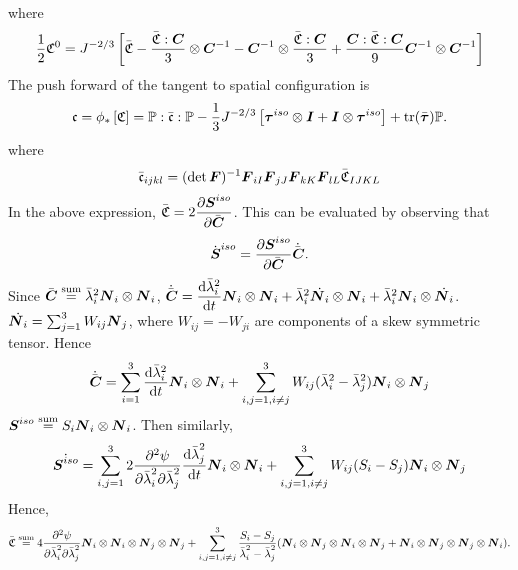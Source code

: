\documentclass[11pt,twoside,TimesRoman]{article}
\newcommand{\parder}[2]{{\dfrac{\partial #1}{\partial #2}}}
\newcommand{\totder}[2]{{\dfrac{\mathrm{d} #1}{\mathrm{d}#2}}}
\begin{document}
where
\begin{equation}
\frac{1}{2}\mathfrak{C}^0=   J^{-2/3}\left[\bar{\mathfrak{C}} - \frac{\bar{\mathfrak{C}}: \mbox{\boldmath $C$}}{3}  \otimes \mbox{\boldmath $C$}^{-1} - {\mbox{\boldmath $C$}}^{-1} \otimes \frac{\bar{\mathfrak{C}}: \mbox{\boldmath $C$}}{3} + \frac{\mbox{\boldmath $C$}:\bar{\mathfrak{C}} :\mbox{\boldmath $C$}}{9}  {\mbox{\boldmath $C$}}^{-1} \otimes {\mbox{\boldmath $C$}}^{-1} \right] 
\end{equation}
The push forward of the tangent to spatial configuration is
\begin{equation}
 \mathfrak{c} = \phi_* \left[\mathfrak{C} \right] =  \mathbb{P}:\bar{\mathfrak{c}}:\mathbb{P} - \frac{1}{3} J^{-2/3} \left[{\mbox{\boldmath $\tau$}}^{iso} \otimes \mbox{\boldmath $I$}  +\mbox{\boldmath $I$} \otimes  {\mbox{\boldmath $\tau$}}^{iso} \right] + \text{tr}(\bar{\mbox{\boldmath $\tau$}}) \mathbb{P}.
\end{equation}
where 
\begin{equation}
	\bar{\mathfrak{c}}_{ijkl} = (\det \mbox{\boldmath $F$})^{-1} \mbox{\boldmath $F$}_{iI} \mbox{\boldmath $F$}_{jJ} \mbox{\boldmath $F$}_{kK} \mbox{\boldmath $F$}_{lL} \bar{\mathfrak{C}}_{IJKL}
\end{equation}
In the above expression, $\bar{\mathfrak{C}} = 2\parder{\bfS^{iso}}{\bfCbar}$. This can be evaluated by observing that
\begin{equation}
	\dot{\bfS}^{iso} = \parder{\bfS^{iso}}{\bfCbar}  \dot{\bfCbar}.
\end{equation}
Since $\bar{\mbox{\boldmath $C$}} \stackrel{\text{sum}}{=}\bar{\lambda}_i^2 \mbox{\boldmath $N$}_i \otimes \mbox{\boldmath $N$}_i$, $\dot{\bfCbar} = \totder{{\bar{\lambda}_i^2}}{t}  \bfN_i \otimes \bfN_i + \bar{\lambda}_i^2 \dot{\bfN_i} \otimes \bfN_i + \bar{\lambda}_i^2 \bfN_i \otimes \dot{\bfN_i} $. $\dot{\mbox{\boldmath $N$}_i} = \sum_{j=1}^{3} W_{ij} \mbox{\boldmath $N$}_j$, where $W_{ij} = -W_{ji}$ are components of a skew symmetric tensor. Hence 
\begin{equation}
	\dot{\bfCbar} = \sum_{i=1}^{3}\totder{{\bar{\lambda}_i^2}}{t}  \bfN_i \otimes \bfN_i + \sum_{i,j=1, i\neq j}^{3}W_{ij}({\bar{\lambda}_i^2}-{\bar{\lambda}_j^2}) \bfN_i \otimes \bfN_j
\end{equation}
$\mbox{\boldmath $S$}^{iso} \stackrel{\text{sum}}{=} S_i \mbox{\boldmath $N$}_i \otimes \mbox{\boldmath $N$}_i $. Then similarly,
\begin{equation}
	\dot{\bfS^{iso}} = \sum_{i,j=1}^{3}2\parder{^2\psi}{\lambdabar_i^2 \partial \lambdabar_j^2} \totder{\lambdabar_j^2}{t} \bfN_i \otimes \bfN_i + \sum_{i,j=1, i\neq j}^{3}W_{ij}(S_i-S_j) \bfN_i \otimes \bfN_j
\end{equation}
Hence, 
\begin{equation}
	\bar{\mathfrak{C}} \stackrel{\text{sum}}{=} 4 \parder{^2\psi}{\lambdabar_i^2 \partial \lambdabar_j^2} \bfN_i \otimes \bfN_i \otimes \bfN_j \otimes \bfN_j + \sum_{i,j=1, i\neq j}^{3} \frac{S_i-S_j}{\lambdabar_i^2 - \lambdabar_j^2}(\bfN_i \otimes \bfN_j \otimes \bfN_i \otimes \bfN_j + \bfN_i \otimes \bfN_j \otimes \bfN_j \otimes \bfN_i).
\end{equation}
\end{document}

